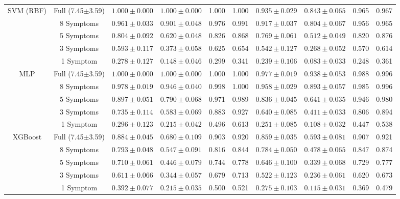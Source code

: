 \begin{table}[H]
{\begin{tabular}{cc|cccc|cccc}
\midrule
\multirow{5}{*}{SVM (RBF)}
& Full (7.45$\pm$3.59) & $1.000 \pm 0.000$ & $1.000 \pm 0.000$ & 1.000 & 1.000 & $0.935 \pm 0.029$ & $0.843 \pm 0.065$ & 0.965 & 0.967 \\
& 8 Symptoms  & $0.961 \pm 0.033$ & $0.901 \pm 0.048$ & 0.976 & 0.991 & $0.917 \pm 0.037$ & $0.804 \pm 0.067$ & 0.956 & 0.965 \\
& 5 Symptoms  & $0.804 \pm 0.092$ & $0.620 \pm 0.048$ & 0.826 & 0.868 & $0.769 \pm 0.061$ & $0.512 \pm 0.049$ & 0.820 & 0.876 \\
& 3 Symptoms  & $0.593 \pm 0.117$ & $0.373 \pm 0.058$ & 0.625 & 0.654 & $0.542 \pm 0.127$ & $0.268 \pm 0.052$ & 0.570 & 0.614 \\
& 1 Symptom   & $0.278 \pm 0.127$ & $0.148 \pm 0.046$ & 0.299 & 0.341 & $0.239 \pm 0.106$ & $0.083 \pm 0.033$ & 0.248 & 0.361 \\
\midrule
\multirow{5}{*}{MLP}
& Full (7.45$\pm$3.59) & $1.000 \pm 0.000$ & $1.000 \pm 0.000$ & 1.000 & 1.000 & $0.977 \pm 0.019$ & $0.938 \pm 0.053$ & 0.988 & 0.996 \\
& 8 Symptoms  & $0.978 \pm 0.019$ & $0.946 \pm 0.040$ & 0.998 & 1.000 & $0.958 \pm 0.029$ & $0.893 \pm 0.057$ & 0.985 & 0.996 \\
& 5 Symptoms  & $0.897 \pm 0.051$ & $0.790 \pm 0.068$ & 0.971 & 0.989 & $0.836 \pm 0.045$ & $0.641 \pm 0.035$ & 0.946 & 0.980 \\
& 3 Symptoms  & $0.735 \pm 0.114$ & $0.583 \pm 0.069$ & 0.883 & 0.927 & $0.640 \pm 0.085$ & $0.411 \pm 0.033$ & 0.806 & 0.894 \\
& 1 Symptom   & $0.296 \pm 0.123$ & $0.215 \pm 0.042$ & 0.496 & 0.613 & $0.251 \pm 0.085$ & $0.108 \pm 0.032$ & 0.447 & 0.538 \\
\midrule
\multirow{5}{*}{XGBoost}
& Full (7.45$\pm$3.59) & $0.884 \pm 0.045$ & $0.680 \pm 0.109$ & 0.903 & 0.920 & $0.859 \pm 0.035$ & $0.593 \pm 0.081$ & 0.907 & 0.921 \\
& 8 Symptoms  & $0.793 \pm 0.048$ & $0.547 \pm 0.091$ & 0.816 & 0.844 & $0.784 \pm 0.050$ & $0.478 \pm 0.065$ & 0.847 & 0.874 \\
& 5 Symptoms  & $0.710 \pm 0.061$ & $0.446 \pm 0.079$ & 0.744 & 0.778 & $0.646 \pm 0.100$ & $0.339 \pm 0.068$ & 0.729 & 0.777 \\
& 3 Symptoms  & $0.611 \pm 0.066$ & $0.344 \pm 0.057$ & 0.679 & 0.713 & $0.522 \pm 0.123$ & $0.236 \pm 0.061$ & 0.620 & 0.673 \\
& 1 Symptom   & $0.392 \pm 0.077$ & $0.215 \pm 0.035$ & 0.500 & 0.521 & $0.275 \pm 0.103$ & $0.115 \pm 0.031$ & 0.369 & 0.479 \\

\end{tabular}}
\end{table}
